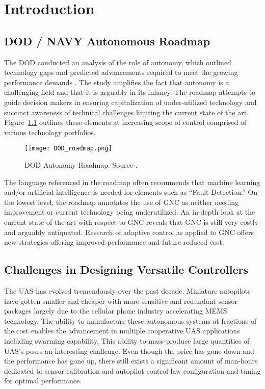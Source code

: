 \chapter{Introduction}\label{ch:intro}

\section{DOD / NAVY Autonomous Roadmap}
The \ac{DOD} conducted an analysis of the role of autonomy, which outlined technology gaps and predicted advancements required to meet the growing performance demands \cite{dodroadmap}.  The study amplifies the fact that autonomy is a challenging field and that it is arguably in its infancy.  The roadmap attempts to guide decision makers in ensuring capitalization of under-utilized technology and succinct awareness of technical challenges limiting the current state of the art.  Figure~\ref{fig:dod_roadmap} outlines these elements at increasing scope of control comprised of various technology portfolios.  
\begin{figure}[h!]
 \centering
  \texttt{[image: DOD\_roadmap.png]}
  \caption{DOD Autonomy Roadmap.  Source \cite{dodroadmap}.}
  \label{fig:dod_roadmap}
\end{figure}
The language referenced in the roadmap often recommends that machine learning and/or artificial intelligence is needed for elements such as \enquote{Fault Detection.}  On the lowest level, the roadmap annotates the use of \ac{GNC} as neither needing improvement or current technology being underutilized.  An in-depth look at the current state of the art with respect to \ac{GNC} reveals that \ac{GNC} is still very costly and arguably antiquated.  Research of adaptive control as applied to \ac{GNC} offers new strategies offering improved performance and future reduced cost.

\section{Challenges in Designing Versatile Controllers}
The \ac{UAS} has evolved tremendously over the past decade.  Miniature autopilots have gotten smaller and cheaper with more sensitive and redundant sensor packages largely due to the cellular phone industry accelerating \ac{MEMS} technology.  The ability to manufacture these autonomous systems at fractions of the cost enables the advancement in multiple cooperative \ac{UAS} applications including swarming capability.  This ability to mass-produce large quantities of \ac{UAS}'s poses an interesting challenge.  Even though the price has gone down and the performance has gone up, there still exists a significant amount of man-hours dedicated to sensor calibration and autopilot control law configuration and tuning for optimal performance.  

